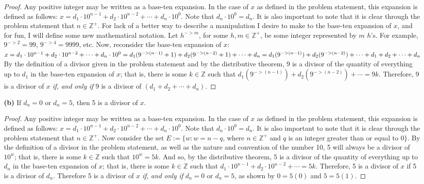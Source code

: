 \documentclass[12pt]{article}
\begin{document}
\begin{proof}
Any positive integer may be written as a base-ten expansion. In the case of $x$ as defined in the problem statement, this expansion is defined as follows: $x = d_1 \cdot 10^{n - 1} + d_2 \cdot 10^{n-2} + \cdots + d_n \cdot 10^0$. Note that $d_n \cdot 10^0 = d_n$. It is also important to note that it is clear through the problem statement that $n \in\mathbb{Z^+}$. For lack of a better way to describe a manipulation I desire to make to the base-ten expansion of $x$, and for fun, I will define some new mathematical notation. Let $h^{->m}$, for some $h,m \in\mathbb{Z^+}$, be some integer represented by $m$ $h$'s. For example, $9^{->2} = 99$, $9^{->4} = 9999$, etc. Now, reconsider the base-ten expansion of $x$: \newline $x = d_1 \cdot 10^{n - 1} + d_2 \cdot 10^{n-2} + \cdots + d_n \cdot 10^0 = d_1(9^{->(n-1)} + 1) + d_2(9^{->(n-2)} + 1) + \cdots + d_n \newline = d_1(9^{->(n-1)}) + d_2(9^{->(n-2)}) + \cdots + d_1 + d_2 + \cdots + d_n$
\newline
By the definition of a divisor given in the problem statement and by the distributive theorem, 9 is a divisor of the quantity of everything up to $d_1$ in the base-ten expansion of $x$; that is, there is some $k \in\mathbb{Z}$ such that $d_1(9^{->(n-1)}) + d_2(9^{->(n-2)}) + \cdots = 9k$. Therefore, 9 is a divisor of $x$ \textit{if, and only if} 9 is a divisor of $(d_1 + d_2 + \cdots + d_n)$.
\end{proof}

\begin{description}
\item \textbf{(b)} If $d_n = 0$ or $d_n = 5$, then 5 is a divisor of $x$.
\end{description}

\begin{proof}
Any positive integer may be written as a base-ten expansion. In the case of $x$ as defined in the problem statement, this expansion is defined as follows: $x = d_1 \cdot 10^{n - 1} + d_2 \cdot 10^{n-2} + \cdots + d_n \cdot 10^0$. Note that $d_n \cdot 10^0 = d_n$. It is also important to note that it is clear through the problem statement that $n \in\mathbb{Z^+}$. Now consider the set $E := \{w: w = n - q$, where $n \in\mathbb{Z^+}$ and $q$ is an integer greater than or equal to $0\}$. By the definition of a divisor in the problem statement, as well as the nature and convention of the number 10, 5 will always be a divisor of $10^w$; that is, there is some $k \in\mathbb{Z}$ such that $10^w = 5k$. And so, by the distributive theorem, 5 is a divisor of the quantity of everything up to $d_n$ in the base-ten expansion of $x$; that is, there is some $k \in\mathbb{Z}$ such that $d_1 \cdot 10^{n - 1} + d_2 \cdot 10^{n-2} + \cdots = 5k$. Therefore, 5 is a divisor of $x$ if 5 is a divisor of $d_n$. Therefore 5 is a divisor of $x$ \textit{if, and only if} $d_n = 0$ or $d_n = 5$, as shown by $0 = 5(0)$ and $5 = 5(1)$.
\end{proof}
\end{document}
